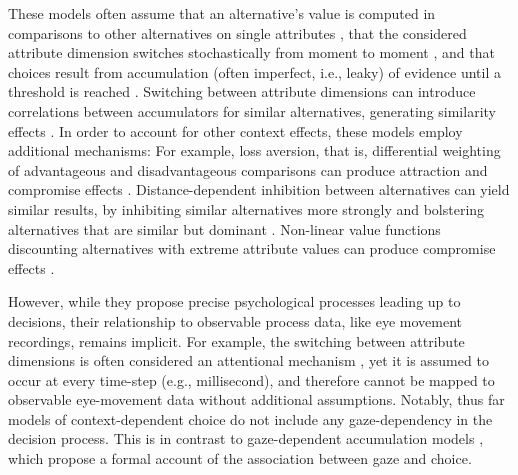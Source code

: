 \documentclass[11pt, a4paper]{article}
\begin{document}
These models often assume that an alternative’s value is computed in comparisons to other alternatives on single attributes \parencite[e.g.,][]{roe2001MultialternativeDecisionField,usher2004LossAversionInhibition}, that the considered attribute dimension switches stochastically from moment to moment \parencite[e.g.][]{bhatia2013AssociationsAccumulationPreference,roe2001MultialternativeDecisionField,usher2004LossAversionInhibition}, and that choices result from accumulation (often imperfect, i.e., leaky) of evidence until a threshold is reached \parencite{bhatia2013AssociationsAccumulationPreference,roe2001MultialternativeDecisionField,trueblood2014MultiattributeLinearBallistic,usher2004LossAversionInhibition}. Switching between attribute dimensions can introduce correlations between accumulators for similar alternatives, generating similarity effects \parencite{bhatia2013AssociationsAccumulationPreference,roe2001MultialternativeDecisionField,turner2018CompetingTheoriesMultialternative,usher2004LossAversionInhibition}. In order to account for other context effects, these models employ additional mechanisms: For example, loss aversion, that is, differential weighting of advantageous and disadvantageous comparisons can produce attraction and compromise effects \parencite{usher2004LossAversionInhibition}. Distance-dependent inhibition between alternatives can yield similar results, by inhibiting similar alternatives more strongly and bolstering alternatives that are similar but dominant \parencite{roe2001MultialternativeDecisionField}. Non-linear value functions discounting alternatives with extreme attribute values can produce compromise effects \parencite{trueblood2014MultiattributeLinearBallistic}. 

However, while they propose precise psychological processes leading up to decisions, their relationship to observable process data, like eye movement recordings, remains implicit. For example, the switching between attribute dimensions is often considered an attentional mechanism \parencite{bhatia2013AssociationsAccumulationPreference,roe2001MultialternativeDecisionField,turner2018CompetingTheoriesMultialternative,usher2004LossAversionInhibition}, yet it is assumed to occur at every time-step (e.g., millisecond), and therefore cannot be mapped to observable eye-movement data without additional assumptions. Notably, thus far models of context-dependent choice do not include any gaze-dependency in the decision process. This is in contrast to gaze-dependent accumulation models \parencite{cavanagh2014EyeTrackingPupillometry,glickman2019FormationPreferenceRisky,krajbich2010VisualFixationsComputation,krajbich2011MultialternativeDriftdiffusionModel,molter2019GLAMboxPythonToolbox,thomas2019GazeBiasDifferences}, which propose a formal account of the association between gaze and choice.
\end{document}
